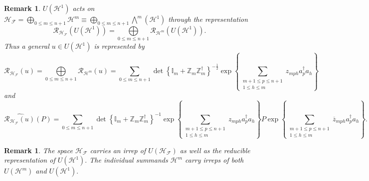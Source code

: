 \documentclass[aps,preprint]{revtex4}%
\newtheorem{remark}[theorem]{Remark}
\begin{document}
\begin{remark}
$U\left(  \mathcal{H}^{1}\right)  $ acts on $\mathcal{H}_{\mathcal{F}}=%
{\textstyle\bigoplus\limits_{0\leq m\leq n+1}}
\mathcal{H}^{m}\equiv%
{\textstyle\bigoplus\limits_{0\leq m\leq n+1}}
{\textstyle\bigwedge\nolimits^{m}}
\left(  \mathcal{H}^{1}\right)  $ through the representation
\begin{equation}
\mathcal{R}_{\mathcal{H}_{\mathcal{F}}}\left(  U\left(  \mathcal{H}%
^{1}\right)  \right)  =%
{\textstyle\bigoplus\limits_{0\leq m\leq n+1}}
\mathcal{R}_{\mathcal{H}^{m}}\left(  U\left(  \mathcal{H}^{1}\right)  \right)
.
\end{equation}
Thus a general $u\in U\left(  \mathcal{H}^{1}\right)  $ is represented by
\begin{equation}
\mathcal{R}_{\mathcal{H}_{\mathcal{F}}}\left(  u\right)  =%
{\textstyle\bigoplus\limits_{0\leq m\leq n+1}}
\mathcal{R}_{\mathcal{H}^{m}}\left(  u\right)  =\sum_{0\leq m\leq n+1}%
\det\left\{  \mathbb{I}_{m}+\mathbb{Z}_{m}\mathbb{Z}_{m}^{\dagger}\right\}
^{-\frac{1}{2}}\exp\left\{  \sum_{\substack{m+1\leq p\leq n+1\\1\leq h\leq
m}}z_{mph}a_{p}^{\dagger}a_{h}\right\}
\end{equation}
and
\begin{equation}
\widehat{\mathcal{R}_{\mathcal{H}_{\mathcal{F}}}\left(  u\right)  }\left(
P\right)  =\sum_{0\leq m\leq n+1}\det\left\{  \mathbb{I}_{m}+\mathbb{Z}%
_{m}\mathbb{Z}_{m}^{\dagger}\right\}  ^{-1}\exp\left\{  \sum
_{\substack{m+1\leq p\leq n+1\\1\leq h\leq m}}z_{mph}a_{p}^{\dagger}%
a_{h}\right\}  P\exp\left\{  \sum_{\substack{m+1\leq p\leq n+1\\1\leq h\leq
m}}\overline{z}_{mph}a_{p}^{\dagger}a_{h}\right\}  .
\end{equation}

\end{remark}

\begin{remark}
The space $\mathcal{H}_{\mathcal{F}}$ carries an irrep of $U\left(
\mathcal{H}_{\mathcal{F}}\right)  $ as well as the reducible representation of
$U\left(  \mathcal{H}^{1}\right)  .$ The individual summands $\mathcal{H}^{m}$
carry irreps of both $U\left(  \mathcal{H}^{m}\right)  $ and $U\left(
\mathcal{H}^{1}\right)  .$
\end{remark}
\end{document}
